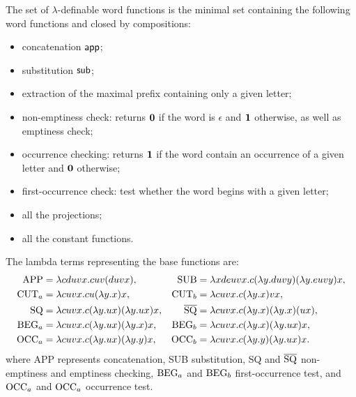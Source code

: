 \begin{theorem}
The set of $\lambda$-definable word functions is the minimal set containing the following word functions and closed by compositions:
\begin{itemize}
  \item concatenation ${\sf app}$;
  \item substitution ${\sf sub}$;
  \item extraction of the maximal prefix containing only a given letter;
  \item non-emptiness check:  returns $\mathbf{0}$ if the word is $\epsilon$ and $\mathbf{1}$ otherwise, as well as emptiness check;
  \item occurrence checking: returns $\mathbf{1}$ if the word contain an occurrence of a given letter and $\mathbf{0}$ otherwise;
  \item first-occurrence check:  test whether the word begins with a given letter;
  \item all the projections;
  \item all the constant functions.
\end{itemize}
\end{theorem}
The lambda terms representing the base functions are:
\begin{align*}
  {\rm APP} &= \lambda c d u v x.c u v(d u v x), & {\rm SUB} &= \lambda x d e u v x.c(\lambda y.d u v y)(\lambda y . e u v y) x, \\
  {\rm CUT}_a &= \lambda c u v x . c u (\lambda y.x) x, & {\rm CUT}_b &= \lambda c u v x . c (\lambda y.x) v x, \\
  {\rm SQ} &= \lambda c u v x . c (\lambda y.u x) (\lambda y.u x) x, & \overline{{\rm SQ}} &= \lambda c u v x . c (\lambda y.x) (\lambda y.x) (u x), \\
  {\rm BEG}_a &= \lambda c u v x . c (\lambda y.u x) (\lambda y.x) x, & {\rm BEG}_b &= \lambda c u v x . c (\lambda y.x) (\lambda y.u x) x, \\
  {\rm OCC}_a &= \lambda c u v x . c (\lambda y.u x) (\lambda y.y) x, & {\rm OCC}_b &= \lambda c u v x . c (\lambda y.y) (\lambda y.u x) x.
\end{align*}
where {\rm APP} represents concatenation, {\rm SUB} substitution, 
{\rm SQ} and $\overline{{\rm SQ}}$ non-emptiness and emptiness checking, ${\rm BEG}_a$ and
${\rm BEG}_b$ first-occurrence test, and ${\rm OCC}_a$ and ${\rm OCC}_a$ occurrence test. 

